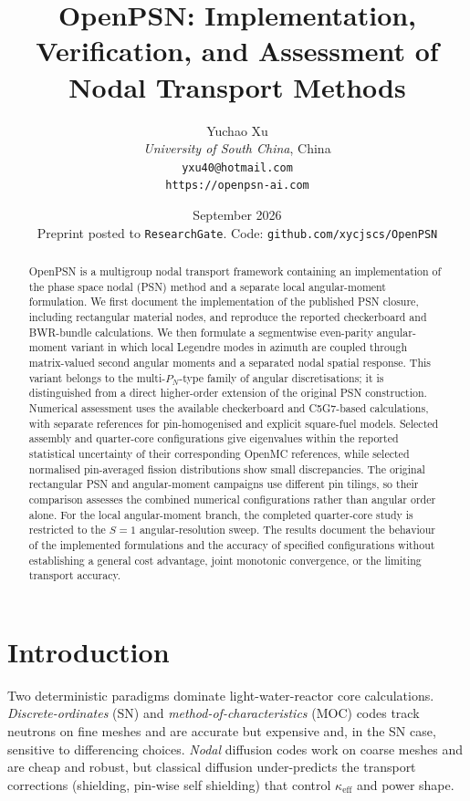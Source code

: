 \documentclass[11pt,a4paper]{article}
\title{\bf OpenPSN: Implementation, Verification, and Assessment of
Nodal Transport Methods}
\author{
  Yuchao Xu \\
  \textit{University of South China}, China \\
  \texttt{yxu40@hotmail.com} \\
  \texttt{https://openpsn-ai.com}
}
\date{September 2026\\[2pt]
  \small Preprint posted to \texttt{ResearchGate}.
  Code: \texttt{github.com/xycjscs/OpenPSN}}
\newcommand{\keff}{\kappa_{\mathrm{eff}}}
\begin{document}
\maketitle

\begin{abstract}
OpenPSN is a multigroup nodal transport framework containing an
implementation of the phase space nodal (PSN) method and a separate
local angular-moment formulation. We first document the implementation
of the published PSN closure, including rectangular material nodes, and
reproduce the reported checkerboard and BWR-bundle calculations. We then
formulate a segmentwise even-parity angular-moment variant in which
local Legendre modes in azimuth are coupled through matrix-valued second
angular moments and a separated nodal spatial response. This variant
belongs to the multi-$P_N$-type family of angular discretisations; it is
distinguished from a direct higher-order extension of the original PSN
construction. Numerical assessment uses the available checkerboard and
C5G7-based calculations, with separate references for pin-homogenised
and explicit square-fuel models. Selected assembly and quarter-core
configurations give eigenvalues within the reported statistical
uncertainty of their corresponding OpenMC references, while selected
normalised pin-averaged fission distributions show small
discrepancies. The original rectangular PSN and angular-moment campaigns
use different pin tilings, so their comparison assesses the combined
numerical configurations rather than angular order alone. For the local
angular-moment branch, the completed quarter-core study is restricted to
the $S{=}1$ angular-resolution sweep. The results document the behaviour
of the implemented formulations and the accuracy of specified
configurations without establishing a general cost advantage, joint
monotonic convergence, or the limiting transport accuracy.
\end{abstract}

\section{Introduction}

Two deterministic paradigms dominate light-water-reactor core calculations.
\emph{Discrete-ordinates} (SN) and \emph{method-of-characteristics} (MOC)
codes track neutrons on fine meshes and are accurate but expensive and, in the
SN case, sensitive to differencing choices. \emph{Nodal} diffusion codes
work on coarse meshes and are cheap and robust, but classical diffusion
under-predicts the transport corrections (shielding, pin-wise self
shielding) that control $\keff$ and power shape.
\end{document}
